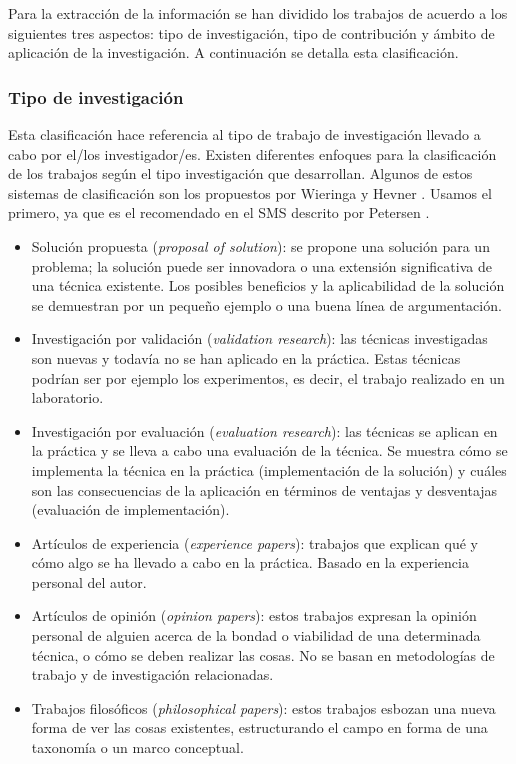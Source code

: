 Para la extracción de la información se han dividido los trabajos de acuerdo a los siguientes tres aspectos: tipo de investigación, tipo de contribución y ámbito de aplicación de la investigación. A continuación se detalla esta clasificación.

\subsubsection{Tipo de investigación}
Esta clasificación hace referencia al tipo de trabajo de investigación llevado a cabo por el/los investigador/es. Existen diferentes enfoques para la clasificación de los trabajos según el tipo investigación que desarrollan. Algunos de estos sistemas de clasificación son los propuestos por Wieringa \cite{Wieringa:2005} y Hevner \cite{Hevner:2004}. Usamos el primero, ya que es el recomendado en el SMS descrito por Petersen \cite{Petersen:2008}.
\begin{itemize}
\item Solución propuesta (\emph{proposal of solution}): se propone una solución para un problema; la solución puede ser innovadora o una extensión significativa de una técnica existente. Los posibles beneficios y la aplicabilidad de la solución se demuestran por un pequeño ejemplo o una buena línea de argumentación.
\item Investigación por validación (\emph{validation research}): las técnicas investigadas son nuevas y todavía no se han aplicado en la práctica. Estas técnicas podrían ser por ejemplo los experimentos, es decir, el trabajo realizado en un laboratorio.
\item Investigación por evaluación (\emph{evaluation research}): las técnicas se aplican en la práctica y se lleva a cabo una evaluación de la técnica. Se muestra cómo se implementa la técnica en la práctica (implementación de la solución) y cuáles son las consecuencias de la aplicación en términos de ventajas y desventajas (evaluación de implementación).
\item Artículos de experiencia (\emph{experience papers}): trabajos que explican qué y cómo algo se ha llevado a cabo en la práctica. Basado en la experiencia personal del autor.
\item Artículos de opinión (\emph{opinion papers}): estos trabajos expresan la opinión personal de alguien acerca de la bondad o viabilidad de una determinada técnica, o cómo se deben realizar las cosas. No se basan en metodologías de trabajo y de investigación relacionadas.
\item Trabajos filosóficos (\emph{philosophical papers}): estos trabajos esbozan una nueva forma de ver las cosas existentes, estructurando el campo en forma de una taxonomía o un marco conceptual.
\end{itemize}

